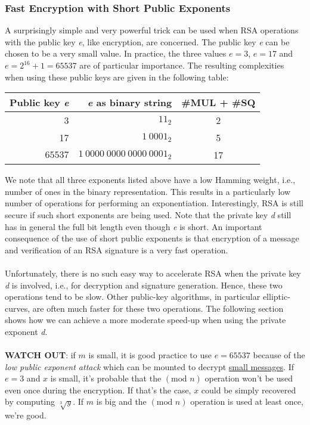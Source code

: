 \newpage
\subsubsection{Fast Encryption with Short Public Exponents}
A surprisingly simple and very powerful trick can be used when RSA operations with the public key \textit{e}, like encryption, are concerned. The public key \textit{e} can be chosen to be a very small value. In practice, the three values $e=3$, $e=17$ and $e=2^{16}+1=65537$ are of particular importance. The resulting complexities when using these public keys are given in the following table:
\begin{center}
    \begin{tabular}{|r|r|c|}
        \hline
        Public key \textit{e} & \textit{e} as binary string & \#MUL + \#SQ\\
        \hline
        3 & $11_2$ & 2\\
        17 & $1\ 0001_2$ & 5\\
        $65537$ & $1\ 0000\ 0000\ 0000\ 0001_2$ & 17\\
        \hline
    \end{tabular}
\end{center}
We note that all three exponents listed above have a low Hamming weight, i.e., number of ones in the binary representation. This results in a particularly low number of operations for performing an exponentiation. Interestingly, RSA is still secure if such short exponents are being used. Note that the private key \textit{d} still has in general the full bit length even though \textit{e} is short. An important consequence of the use of short public exponents is that encryption of a message and verification of an RSA signature is a very fast operation.\\\\
Unfortunately, there is no such easy way to accelerate RSA when the private key \textit{d} is involved, i.e., for decryption and signature generation. Hence, these two operations tend to be slow. Other public-key algorithms, in particular elliptic-curves, are often much faster for these two operations. The following section shows how we can achieve a more moderate speed-up when using the private exponent \textit{d}.\\\\
\textbf{WATCH OUT}: if $m$ is small, it is good practice to use $e=65537$ because of the \textit{low public exponent attack} which can be mounted to decrypt \underline{small messages}. If $e=3$ and $x$ is small, it's probable that the $(\text{mod }{n})$ operation won't be used even once during the encryption. If that's the case, $x$ could be simply recovered by computing $\sqrt[3]{y}$. If $m$ is big and the $(\text{mod }{n})$ operation is used at least once, we're good.

